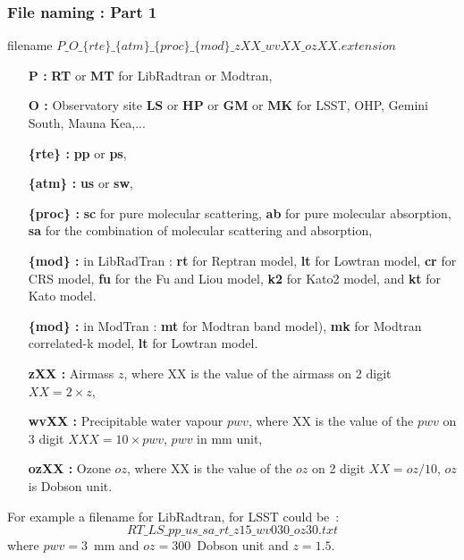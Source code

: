 \documentclass{beamer}
\begin{document}
\begin{frame}
\frametitle{File naming : Part 1 }
\begin{block}{filename}
$P\_O\_\{rte\}\_\{atm\}\_\{proc\}\_\{mod\}\_zXX\_wvXX\_ozXX.extension $ 
\end{block}
{\tiny
\begin{itemize}
\item [{\bf P :} ] {\bf RT} or {\bf MT} for LibRadtran or Modtran,
\item [{\bf O :} ]  Observatory site {\bf LS} or {\bf HP}  or {\bf GM}  or {\bf MK} for LSST, OHP, Gemini South, Mauna Kea,...
\item [{\bf \{rte\} :}] {\bf pp} or  {\bf ps},
\item [{\bf \{atm\} :}]  {\bf us} or {\bf sw},
\item [{\bf \{proc\} :}] {\bf sc} for pure molecular scattering, {\bf ab} for pure molecular absorption, {\bf sa} for the combination of molecular scattering and absorption,
\item [{\bf \{mod\} :}] in LibRadTran :  {\bf rt} for Reptran model, {\bf lt} for Lowtran model, {\bf cr} for CRS model,  {\bf fu} for the Fu and Liou model, {\bf k2} for Kato2 model, and {\bf kt} for Kato model.
\item [{\bf \{mod\} :}] in ModTran :  {\bf mt} for Modtran band model), {\bf mk} for Modtran correlated-k model, {\bf lt} for Lowtran model.
\item [{\bf zXX :} ] Airmass $z$, where XX is the value of the airmass on 2 digit $XX=2\times z$,
\item [{\bf wvXX :} ] Precipitable water vapour $pwv$, where XX is the value of the $pwv$ on 3 digit $XXX=10\times pwv$, $pwv$ in mm unit,
\item [{\bf ozXX :} ] Ozone $oz$, where XX is the value of the $oz$ on 2 digit $XX=oz/10$, $oz$ is Dobson unit.
\end{itemize}

For example a filename for LibRadtran, for LSST could be~:
\begin{equation}
RT\_LS\_pp\_us\_sa\_rt\_z15\_wv030\_oz30.txt  \nonumber
\end{equation}
where $pwv=3$~mm and $oz=300$~Dobson unit and $z=1.5$.

}
\end{frame}
\end{document}
